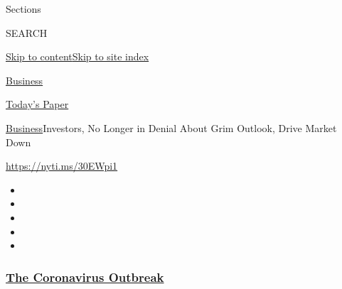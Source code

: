 Sections

SEARCH

\protect\hyperlink{site-content}{Skip to
content}\protect\hyperlink{site-index}{Skip to site index}

\href{https://www.nytimes3xbfgragh.onion/section/business}{Business}

\href{https://myaccount.nytimes3xbfgragh.onion/auth/login?response_type=cookie\&client_id=vi}{}

\href{https://www.nytimes3xbfgragh.onion/section/todayspaper}{Today's
Paper}

\href{/section/business}{Business}\textbar{}Investors, No Longer in
Denial About Grim Outlook, Drive Market Down

\url{https://nyti.ms/30EWpi1}

\begin{itemize}
\item
\item
\item
\item
\item
\end{itemize}

\hypertarget{the-coronavirus-outbreak}{%
\subsubsection{\texorpdfstring{\href{https://www.nytimes3xbfgragh.onion/news-event/coronavirus?name=styln-coronavirus-markets\&region=TOP_BANNER\&block=storyline_menu_recirc\&action=click\&pgtype=Article\&impression_id=b04528b0-f52c-11ea-aab9-5d05d5926c06\&variant=undefined}{The
Coronavirus
Outbreak}}{The Coronavirus Outbreak}}\label{the-coronavirus-outbreak}}

